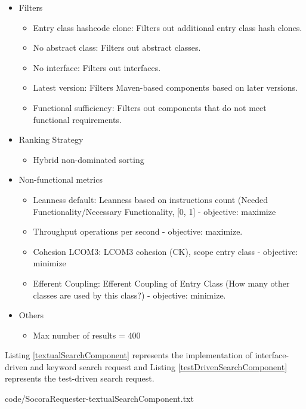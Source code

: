\begin{itemize}
\item Filters
	\begin{itemize}
	\item Entry class hashcode clone: Filters out additional entry class hash clones.
	\item No abstract class: Filters out abstract classes.
	\item No interface: Filters out interfaces.
	\item Latest version: Filters Maven-based components based on later versions.
	\item Functional sufficiency: Filters out components that do not meet functional requirements.
	\end{itemize}
\item Ranking Strategy
	\begin{itemize}
	\item Hybrid non-dominated sorting
	\end{itemize}
\item Non-functional metrics
	\begin{itemize}
	\item Leanness default: Leanness based on instructions count (Needed Functionality/Necessary Functionality, [0, 1] - objective: maximize
	\item Throughput operations per second - objective: maximize.
	\item Cohesion LCOM3: LCOM3 cohesion (CK), scope entry class - objective: minimize
	\item Efferent Coupling: Efferent Coupling of Entry Class (How many other classes are used by this class?) - objective: minimize.
	\end{itemize}
\item Others
	\begin{itemize}
	\item Max number of results = 400
	\end{itemize}
\end{itemize}

Listing \ref{textualSearchComponent} represents the implementation of interface-driven and keyword search request and Listing \ref{testDrivenSearchComponent} represents the test-driven search request.


{code/SocoraRequester-textualSearchComponent.txt}

